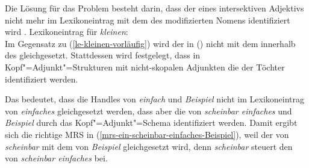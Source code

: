 Die Lösung für das Problem besteht darin, dass der \ltopw eines intersektiven Adjektivs nicht mehr
im Lexikoneintrag mit dem des modifizierten Nomens identifiziert wird \citep[Section~6.3]{CFPS2005a}. 
\eas
\label{le-kleinen-sem}%
Lexikoneintrag für \emph{kleinen}:\\%
\zs
Im Gegensatz zu (\ref{le-kleinen-vorläufig}) wird der \ltopw in () nicht mit dem \ltopw innerhalb des \modwes gleichgesetzt.
Stattdessen wird festgelegt, dass in Kopf"=Adjunkt"=Strukturen mit nicht-skopalen Adjunkten die \ltopwe der Töchter identifiziert
werden. 
\ea
\label{ex-scopal-ltop}
 \impl\\[2mm]
\hfill 
{}
\z

\noindent
Das bedeutet, dass die Handles von \emph{einfach} und \emph{Beispiel} nicht im
Lexikoneintrag von \emph{einfaches} gleichgesetzt werden, dass aber die \ltopwe von \emph{scheinbar
  einfaches} und \emph{Beispiel} durch das Kopf"=Adjunkt"=Schema identifiziert werden. Damit ergibt
sich die richtige MRS in (\ref{mrs-ein-scheinbar-einfaches-Beispiel}), weil der \ltopw von
\emph{scheinbar} mit dem von \emph{Beispiel} gleichgesetzt wird, denn \emph{scheinbar} steuert
den \ltopw von \emph{scheinbar einfaches} bei.

